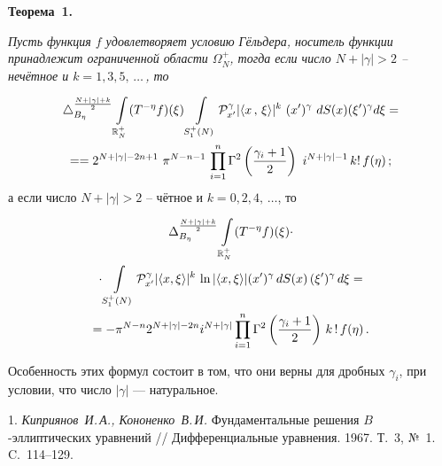 \smallskip
\textbf{Теорема~1.}
{\it Пусть функция $f$ удовлетворяет условию Гёльдера, носитель функции принадлежит ограниченной области $\Omega_{N}^+$,
тогда если число $N+|\gamma|>2$ -- нечётное и $k=1,3,5,\,\ldots\,$, то

\begin{multline*}
	\triangle_{B_{\eta}}^{\frac{N+|\gamma|+k}{2}}
	\int\limits_{\mathbb{R}_N^+}(T^{-\eta}f)(\xi)
	\int\limits_{S^+_1(N)}{\cal P}_{x'}^\gamma |\langle x\,,\,\xi\rangle|^k\,\,
	(x')^\gamma\,\,dS(x)(\xi')^{\gamma} d\xi=
	\\=
	=2^{N+|\gamma|-2n+1}\,\,
	\pi^{N-n-1}\,
	\prod\limits_{i=1}^{n}\Gamma^2\left(\frac{\gamma_i+1}{2}\right)
	\,\,i^{N+|\gamma|-1}\,k!
	\, f(\eta)\,;
\end{multline*}
а если
число $N+|\gamma|>2$ -- чётное и $k=0,2,4,\,\ldots$, то}
\begin{multline*}
\Delta_{B_{\eta}}^{\frac{N+|\gamma|+k}{2}}\int\limits_{\mathbb{R}_N^+}(T^{-\eta}f)(\xi)
\cdot \\ \cdot
\int\limits_{S_1^+(N)}{\cal P}_{x'}^\gamma |\langle x,\xi \rangle|^k\,\ln|\langle x,\xi \rangle|
(x')^{\gamma}\,dS(x)\,(\xi')^{\gamma}\,d\xi=
\\=
-\pi^{N-n} 2^{N+|\gamma|-2n} i^{N+|\gamma|}
\prod\limits_{i=1}^{n}\Gamma^2\left(\frac{\gamma_i+1}{2}\right)\,k\,!\,f(\eta)\,.
\end{multline*}

Особенность этих формул состоит в том, что они верны для дробных $\gamma_i$, при условии, что число $|\gamma|$ --- натуральное.

\litlist

1. {\it Киприянов~И.\,А., Кононенко~В.\,И.} Фундаментальные решения $B$-эллиптических уравнений // Дифференциальные уравнения. 1967. Т.~3, №~1.  C.~114--129.
